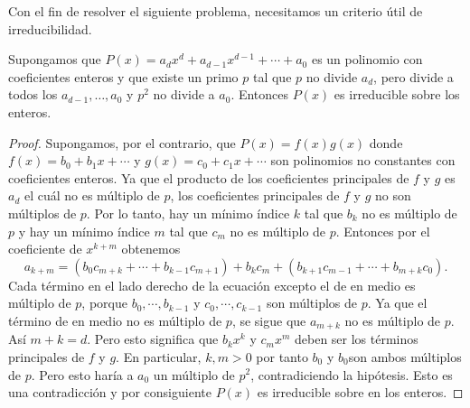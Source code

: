Con el fin de resolver el siguiente problema, necesitamos un criterio útil de irreducibilidad.

\begin{definition}\label{eisenstein}
    Supongamos que $P(x) = a_d x^d + a_{d - 1} x^{d - 1} + \cdots + a_0$ es un polinomio con coeficientes enteros y que existe un primo $p$ tal que $p$ no divide $a_d$, pero divide a todos los $a_{d - 1}, \ldots, a_0$ y $p^2$ no divide a $a_0$.
    Entonces $P(x)$ es irreducible sobre los enteros.
\end{definition}
\begin{proof}
    Supongamos, por el contrario, que $P(x) = f(x) g(x)$ donde $f(x) = b_0 + b_1 x + \cdots$ y $g(x) = c_0 + c_1 x + \cdots$ son polinomios no constantes con coeficientes enteros.
    Ya que el producto de los coeficientes principales de $f$ y $g$ es $a_d$ el cuál no es múltiplo de $p$, los coeficientes principales de $f$ y $g$ no son múltiplos de $p$.
    Por lo tanto, hay un mínimo índice $k$ tal que $b_k$ no es múltiplo de $p$ y hay un mínimo índice $m$ tal que $c_m$ no es múltiplo de $p$.
    Entonces por el coeficiente de $x^{k + m}$ obtenemos
    \[
        a_{k + m} = (b_0 c_{m + k} + \cdots + b_{k - 1} c_{m + 1}) + b_k c_m + (b_{k + 1} c_{m - 1} + \cdots + b_{m + k} c_0).
    \]
    Cada término en el lado derecho de la ecuación excepto el de en medio es múltiplo de $p$, porque $b_0, \cdots, b_{k - 1}$ y $c_0, \cdots, c_{k - 1}$ son múltiplos de $p$.
    Ya que el término de en medio no es múltiplo de $p$, se sigue que $a_{m + k}$ no es múltiplo de $p$.
    Así $m + k = d$.
    Pero esto significa que $b_k x^k$ y $c_m x^m$ deben ser los términos principales de $f$ y $g$.
    En particular, $k,m > 0$ por tanto $b_0$ y $b_0$son ambos múltiplos de $p$.
    Pero esto haría a $a_0$ un múltiplo de $p^2$, contradiciendo la hipótesis.
    Esto es una contradicción y por consiguiente $P(x)$ es irreducible sobre en los enteros.
\end{proof}

